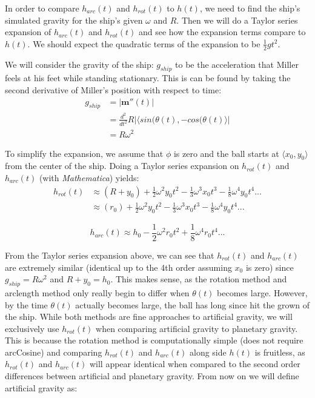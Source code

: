 \documentclass{amsart}
\renewcommand{\vec}{\textbf}
\theoremstyle{definition}
\begin{document}
In order to compare $h_{arc}(t)$ and $h_{rot}(t)$ to $h(t)$, we need to find the ship's simulated gravity for the ship's given $\omega$ and $R$. Then we will do a Taylor series expansion of $h_{arc}(t)$ and $h_{rot}(t)$ and see how the expansion terms compare to $h(t)$. We should expect the quadratic terms of the expansion to be $\frac{1}{2}gt^2$.

We will consider the gravity of the ship: $g_{ship}$  to be the acceleration that Miller feels at his feet while standing stationary. This is can be found by taking the second derivative of Miller's position with respect to time:
\begin{equation}
\begin{split}
     g_{ship}&=\lvert\vec{m}''(t)\rvert \\
     &= \frac{d^2}{dt^2}R\lvert \langle sin(\theta(t),-cos(\theta(t)\rangle \rvert \\
     &=R \omega^2
\end{split}
\end{equation}

To simplify the expansion, we assume that  $\phi$ is zero and the ball starts at $\langle x_0,y_0\rangle$ from the center of the ship. Doing a Taylor series expansion on $h_{rot}(t)$ and $h_{arc}(t)$ (with \textsl{Mathematica}) yields:
\begin{equation}
\begin{split}
     h_{rot}(t) &\approx (R+y_0)+\frac{1}{2}\omega^2 y_0 t^2 - \frac{1}{3}\omega^3 x_0 t^3 -\frac{1}{8}\omega^4 y_0 t^4... \\
     &\approx (r_0)+\frac{1}{2}\omega^2 y_0 t^2 - \frac{1}{3}\omega^3 x_0 t^3 -\frac{1}{8}\omega^4 y_0 t^4...
\end{split}
\end{equation}

\begin{equation}
 h_{arc}(t) \approx h_0 -\frac{1}{2}\omega^2 r_0 t^2 + \frac{1}{8}\omega^4 r_0 t^4 ...
\end{equation}

From the Taylor series expansion above, we can see that $h_{rot}(t)$
and $h_{arc}(t)$ are extremely similar (identical up to the 4th order
assuming $x_0$ is zero) since $g_{ship} = R \omega^2$ and $R+y_0 =
h_0$. This makes sense, as the rotation method and arclength method
only really begin to differ when $\theta(t)$ becomes large. However,
by the time $\theta(t)$ actually becomes large, the ball has long
since hit the grown of the ship. While both methods are fine
approaches to artificial gravity, we will exclusively use $h_{rot}(t)$
when comparing artificial gravity to planetary gravity. This is
because the rotation method is computationally simple (does not
require arcCosine) and comparing $h_{rot}(t)$ and $h_{arc}(t)$ along
side $h(t)$ is fruitless, as $h_{rot}(t)$ and $h_{arc}(t)$ will appear
identical when compared to the second order differences between
artificial and planetary gravity. From now on we will define
artificial gravity as:
\end{document}
